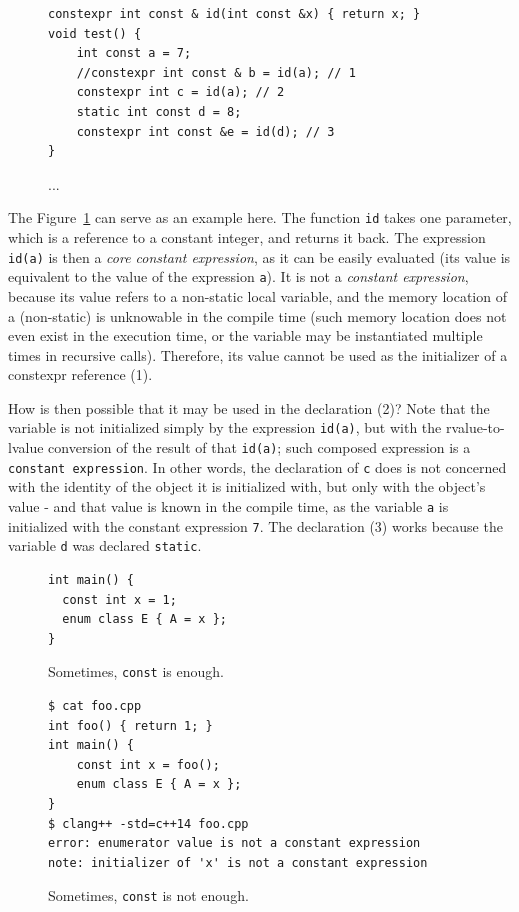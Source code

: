 \documentclass[nolot,nolof,nocover,printed]{fithesis3}
\begin{document}
\begin{figure}
\begin{lstlisting}
constexpr int const & id(int const &x) { return x; }
void test() {
	int const a = 7;
	//constexpr int const & b = id(a); // 1
	constexpr int c = id(a); // 2
	static int const d = 8;
	constexpr int const &e = id(d); // 3
}
\end{lstlisting}
\caption{...}
\label{fig:constexprIntuition}
\end{figure}

The Figure~\ref{fig:constexprIntuition} can serve as an example here. The function \texttt{id} takes one parameter, which is a reference to a constant integer, and returns it back. The expression \lstinline|id(a)| is then a \textit{core constant expression}, as it can be easily evaluated (its value is equivalent to the value of the expression \lstinline|a|). It is not a \textit{constant expression}, because its value refers to a non-static local variable, and the memory location of a (non-static) is unknowable in the compile time (such memory location does not even exist in the execution time, or the variable may be instantiated multiple times in recursive calls). Therefore, its value cannot be used as the initializer of a constexpr reference (1).

How is then possible that it may be used in the declaration (2)? Note that the variable is not initialized simply by the expression \lstinline|id(a)|, but with the rvalue-to-lvalue conversion of the result of that \lstinline|id(a)|; such composed expression is a \texttt{constant expression}. In other words, the declaration of \texttt{c} does is not concerned with the identity of the object it is initialized with, but only with the object's value - and that value is known in the compile time, as the variable \texttt{a} is initialized with the constant expression \texttt{7}. The declaration (3) works because the variable \texttt{d} was declared \texttt{static}.

\begin{figure}[ht]
\begin{lstlisting}
int main() {
  const int x = 1;
  enum class E { A = x };
} 
\end{lstlisting}
\caption{Sometimes, \texttt{const} is enough.}
\label{fig:constMayBeEnough}
\end{figure}

\begin{figure}[ht]
\begin{lstlisting}
$ cat foo.cpp
int foo() { return 1; }
int main() {
    const int x = foo();
    enum class E { A = x };
}
$ clang++ -std=c++14 foo.cpp
error: enumerator value is not a constant expression
note: initializer of 'x' is not a constant expression
\end{lstlisting}
\caption{Sometimes, \texttt{const} is not enough.}
\end{figure}
\end{document}
